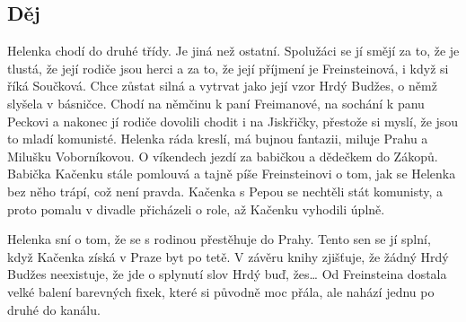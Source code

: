 \subsection*{Děj}
Helenka chodí do druhé třídy. Je jiná než ostatní.
Spolužáci se jí smějí za to, že je tlustá, že její rodiče jsou herci a za to, že její příjmení je Freinsteinová, i když si říká Součková.
Chce zůstat silná a vytrvat jako její vzor Hrdý Budžes, o němž slyšela v básničce.
Chodí na němčinu k paní Freimanové, na sochání k panu Peckovi a nakonec jí rodiče dovolili chodit i na Jiskřičky, přestože si myslí, že jsou to mladí komunisté.
Helenka ráda kreslí, má bujnou fantazii, miluje Prahu a Milušku Voborníkovou.
O víkendech jezdí za babičkou a dědečkem do Zákopů.
Babička Kačenku stále pomlouvá a tajně píše Freinsteinovi o tom, jak se Helenka bez něho trápí, což není pravda.
Kačenka s Pepou se nechtěli stát komunisty, a proto pomalu v divadle přicházeli o role, až Kačenku vyhodili úplně.

Helenka sní o tom, že se s rodinou přestěhuje do Prahy.
Tento sen se jí splní, když Kačenka získá v Praze byt po tetě.
V závěru knihy zjišťuje, že žádný Hrdý Budžes neexistuje, že jde o splynutí slov Hrdý buď, žes…
Od Freinsteina dostala velké balení barevných fixek, které si původně moc přála, ale nahází jednu po druhé do kanálu.

